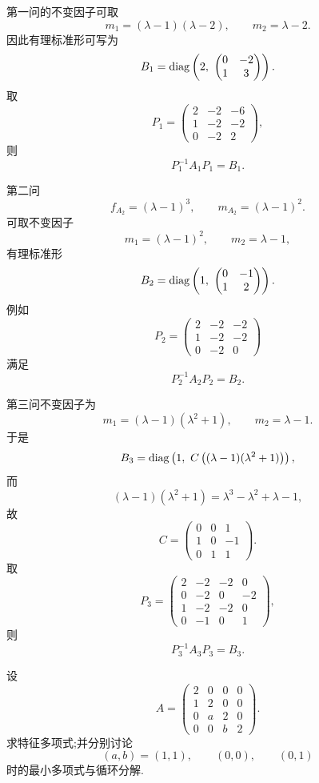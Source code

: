\begin{solution}
第一问的不变因子可取
\[
m_1=(\lambda-1)(\lambda-2),
\qquad
m_2=\lambda-2.
\]
因此有理标准形可写为
\[
B_1=
\operatorname{diag}\left(
2,\
\begin{pmatrix}0&-2\\1&3\end{pmatrix}
\right).
\]
取
\[
P_1=
\begin{pmatrix}
2&-2&-6\\
1&-2&-2\\
0&-2&2
\end{pmatrix},
\]
则
\[
\boxed{P_1^{-1}A_1P_1=B_1}.
\]

第二问
\[
f_{A_2}=(\lambda-1)^3,
\qquad
m_{A_2}=(\lambda-1)^2.
\]
可取不变因子
\[
m_1=(\lambda-1)^2,\qquad m_2=\lambda-1,
\]
有理标准形
\[
B_2=
\operatorname{diag}\left(
1,\
\begin{pmatrix}0&-1\\1&2\end{pmatrix}
\right).
\]
例如
\[
P_2=
\begin{pmatrix}
2&-2&-2\\
1&-2&-2\\
0&-2&0
\end{pmatrix}
\]
满足
\[
\boxed{P_2^{-1}A_2P_2=B_2}.
\]

第三问不变因子为
\[
m_1=(\lambda-1)(\lambda^2+1),
\qquad
m_2=\lambda-1.
\]
于是
\[
B_3=
\operatorname{diag}\left(
1,\
C\left((\lambda-1)(\lambda^2+1)\right)
\right),
\]
而
\[
(\lambda-1)(\lambda^2+1)=\lambda^3-\lambda^2+\lambda-1,
\]
故
\[
C=
\begin{pmatrix}
0&0&1\\
1&0&-1\\
0&1&1
\end{pmatrix}.
\]
取
\[
P_3=
\begin{pmatrix}
2&-2&-2&0\\
0&-2&0&-2\\
1&-2&-2&0\\
0&-1&0&1
\end{pmatrix},
\]
则
\[
\boxed{P_3^{-1}A_3P_3=B_3}.
\]
\end{solution}


\begin{example}
设
\[
A=
\begin{pmatrix}
2&0&0&0\\
1&2&0&0\\
0&a&2&0\\
0&0&b&2
\end{pmatrix}.
\]
求特征多项式;并分别讨论
\[
(a,b)=(1,1),\qquad(0,0),\qquad(0,1)
\]
时的最小多项式与循环分解.
\end{example}
\exampleblank

